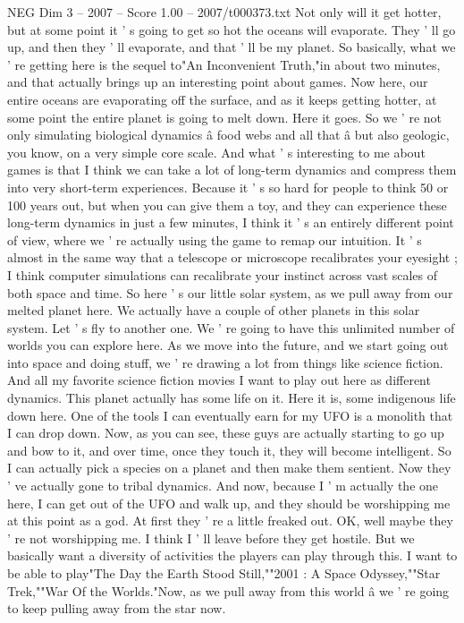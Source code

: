 \begin{textsample}{NEG Dim 3 – 2007 – Score 1.00 – 2007/t000373.txt}
Not only will it get hotter, but at some point it ' s going to get so hot the oceans will evaporate.
They ' ll go up, and then they ' ll evaporate, and that ' ll be my planet.
So basically, what we ' re getting here is the sequel to"An Inconvenient Truth,"in about two minutes, and that actually brings up an interesting point about games.
Now here, our entire oceans are evaporating off the surface, and as it keeps getting hotter, at some point the entire planet is going to melt down.
Here it goes.
So we ' re not only simulating biological dynamics â food webs and all that â but also geologic, you know, on a very simple core scale.
And what ' s interesting to me about games is that I think we can take a lot of long-term dynamics and compress them into very short-term experiences.
Because it ' s so hard for people to think 50 or 100 years out, but when you can give them a toy, and they can experience these long-term dynamics in just a few minutes, I think it ' s an entirely different point of view, where we ' re actually using the game to remap our intuition.
It ' s almost in the same way that a telescope or microscope recalibrates your eyesight ; I think computer simulations can recalibrate your instinct across vast scales of both space and time.
So here ' s our little solar system, as we pull away from our melted planet here.
We actually have a couple of other planets in this solar system.
Let ' s fly to another one.
We ' re going to have this unlimited number of worlds you can explore here.
As we move into the future, and we start going out into space and doing stuff, we ' re drawing a lot from things like science fiction.
And all my favorite science fiction movies I want to play out here as different dynamics.
This planet actually has some life on it.
Here it is, some indigenous life down here.
One of the tools I can eventually earn for my UFO is a monolith that I can drop down.
Now, as you can see, these guys are actually starting to go up and bow to it, and over time, once they touch it, they will become intelligent.
So I can actually pick a species on a planet and then make them sentient.
Now they ' ve actually gone to tribal dynamics.
And now, because I ' m actually the one here, I can get out of the UFO and walk up, and they should be worshipping me at this point as a god.
At first they ' re a little freaked out.
OK, well maybe they ' re not worshipping me.
I think I ' ll leave before they get hostile.
But we basically want a diversity of activities the players can play through this.
I want to be able to play"The Day the Earth Stood Still,""2001 : A Space Odyssey,""Star Trek,""War Of the Worlds."Now, as we pull away from this world â we ' re going to keep pulling away from the star now.

\end{textsample}
